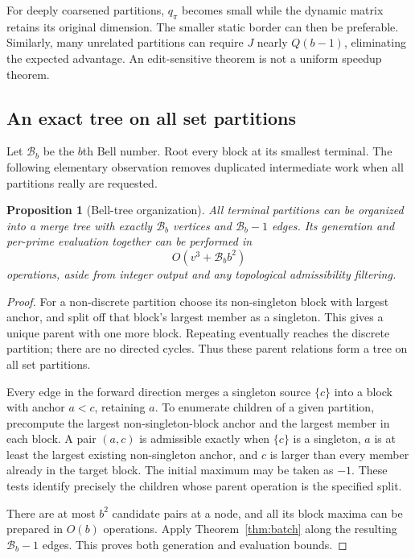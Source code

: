\documentclass[11pt,letterpaper]{article}
\newtheorem{proposition}[theorem]{Proposition}
\theoremstyle{definition}\newtheorem{definition}[theorem]{Definition}
\theoremstyle{remark}\newtheorem{remark}[theorem]{Remark}
\begin{document}
For deeply coarsened partitions, $q_\pi$ becomes small while the dynamic matrix retains its original dimension. The smaller static border can then be preferable. Similarly, many unrelated partitions can require $J$ nearly $Q(b-1)$, eliminating the expected advantage. An edit-sensitive theorem is not a uniform speedup theorem.

\subsection{An exact tree on all set partitions}
Let $\mathcal B_b$ be the $b$th Bell number. Root every block at its smallest terminal. The following elementary observation removes duplicated intermediate work when all partitions really are requested.

\begin{proposition}[Bell-tree organization]
\label{prop:bell}
All terminal partitions can be organized into a merge tree with exactly $\mathcal B_b$ vertices and $\mathcal B_b-1$ edges. Its generation and per-prime evaluation together can be performed in
\[
 O(v^3+\mathcal B_b b^2)
\]
operations, aside from integer output and any topological admissibility filtering.
\end{proposition}
\begin{proof}
For a non-discrete partition choose its non-singleton block with largest anchor, and split off that block's largest member as a singleton. This gives a unique parent with one more block. Repeating eventually reaches the discrete partition; there are no directed cycles. Thus these parent relations form a tree on all set partitions.

Every edge in the forward direction merges a singleton source $\{c\}$ into a block with anchor $a<c$, retaining $a$. To enumerate children of a given partition, precompute the largest non-singleton-block anchor and the largest member in each block. A pair $(a,c)$ is admissible exactly when $\{c\}$ is a singleton, $a$ is at least the largest existing non-singleton anchor, and $c$ is larger than every member already in the target block. The initial maximum may be taken as $-1$. These tests identify precisely the children whose parent operation is the specified split.

There are at most $b^2$ candidate pairs at a node, and all its block maxima can be prepared in $O(b)$ operations. Apply Theorem~\ref{thm:batch} along the resulting $\mathcal B_b-1$ edges. This proves both generation and evaluation bounds.
\end{proof}
\end{document}
